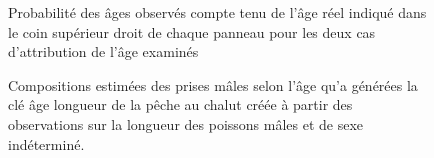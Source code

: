 \documentclass[11pt]{book}
\begin{document}
\begin{figure}[htb]

{\centering {} 

}

\caption{Probabilité des âges observés compte tenu de l’âge réel indiqué dans le coin supérieur droit de chaque panneau pour les deux cas d’attribution de l’âge examinés}\label{fig:unnamed-chunk-31}
\end{figure}
\newpage
\begin{figure}[htb]

{\centering {} 

}

\caption{Compositions estimées des prises mâles selon l’âge qu’a générées la clé âge longueur de la pêche au chalut créée à partir des observations sur la longueur des poissons mâles et de sexe indéterminé.}\label{fig:unnamed-chunk-32}
\end{figure}
\end{document}
